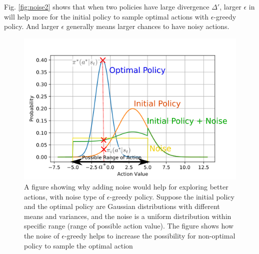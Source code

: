 \documentclass{article}
\begin{document}
Fig. \ref{fig:noise2} shows that when two policies have large divergence $\Delta'$, larger $\epsilon$ in will help more for the initial policy to sample optimal actions with $\epsilon$-greedy policy. And larger $\epsilon$ generally means larger chances to have noisy actions.
\begin{figure}[htbp]
	\centering
	\includegraphics[scale=0.8]{img/noise2.png}
	\caption{A figure showing why adding noise would help for exploring better actions, with noise type of $\epsilon$-greedy policy. Suppose the initial policy and the optimal policy are Gaussian distributions with different means and variances, and the noise is a uniform distribution within specific range (range of possible action value). The figure shows how the noise of $\epsilon$-greedy helps to increase the possibility for non-optimal policy to sample the optimal action }
	\label{fig:noise}
\end{figure}
\end{document}
